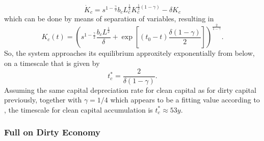 \begin{equation}
	\dot{K}_c = s^{1-\frac{\gamma}{2}} b_c L_c^{\frac{1}{2}}K_c^{\frac{1}{2}(1-\gamma)} - \delta K_c
	\label{eq:learning_trajectory_ode}
\end{equation}
which can be done by means of separation of variables, resulting in
\begin{equation}
  K_c(t) = \left( s^{1-\frac{\gamma}{2}}\frac{b_c L^{\frac{1}{2}}}{\delta} + \exp\left[ (t_0-t) \frac{\delta (1-\gamma)}{2} \right] \right)^{\frac{2}{1-\gamma}}.
	\label{eq:learning_trajectory_solution}
\end{equation}
So, the system approaches its equilibrium approxitely exponentially from below, on a timescale that is given by
\begin{equation}
	t_c^* = \frac{2}{\delta(1-\gamma)}
	\label{eq_learning_equilibrium_timescale}.
\end{equation}
Assuming the same capital depreciation rate for clean capital as for dirty capital previously, together with $\gamma = 1/4$ which appears to be a fitting value according to \cite{Kahouli-Brahmi2008}, the timescale for clean capital accumulation is $t^*_c \approx 53 y$.

\subsubsection{Full on Dirty Economy}
\label{sec:full_dirty_economy}

